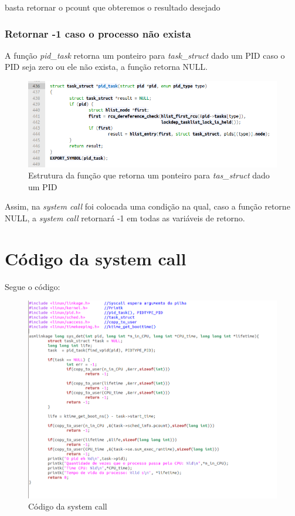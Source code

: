 \documentclass[12pt]{article}
\begin{document}
 	basta retornar o pcount que obteremos o resultado desejado
 \pagebreak
 
\subsubsection{Retornar -1 caso o processo não exista}
A função \textit{pid\_task} retorna um ponteiro para \textit{task\_struct} dado um PID caso o PID seja zero ou ele não exista, a função retorna NULL\cite{getpid}.

\begin{figure}[!htb]
	\centering
\includegraphics[scale=0.5]{imagens/pid.png} 
	\caption{Estrutura da função que retorna um ponteiro para \textit{tas\_struct} dado um PID}
\end{figure}

Assim, na \textit{system call} foi colocada uma condição na qual, caso a função retorne NULL, a \textit{system call} retornará -1 em todas as variáveis de retorno.
\pagebreak
\section{Código da system call}
	Segue o código:

\begin{figure}[!htb]
	\centering
\includegraphics[scale=0.5]{imagens/codigosys.png} 
	\caption{Código da system call}
\end{figure}
	
\end{document}
